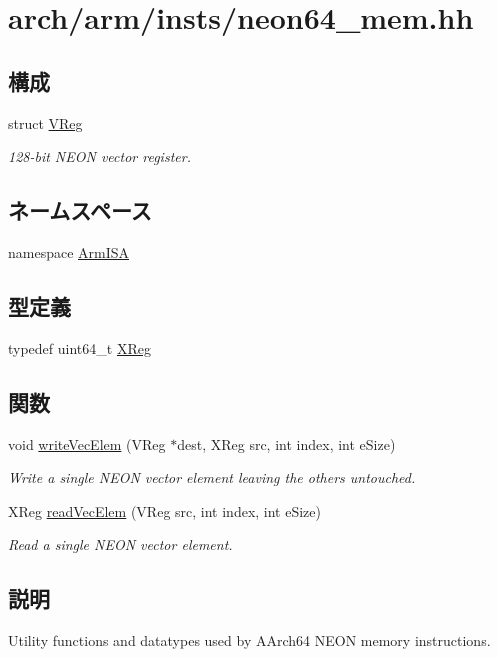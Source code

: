 \hypertarget{neon64__mem_8hh}{
\section{arch/arm/insts/neon64\_\-mem.hh}
\label{neon64__mem_8hh}
}
\subsection*{構成}
\begin{DoxyCompactItemize}
\item 
struct \hyperlink{structArmISA_1_1VReg}{VReg}
\begin{DoxyCompactList}\small\item\em 128-\/bit NEON vector register. \item\end{DoxyCompactList}\end{DoxyCompactItemize}
\subsection*{ネームスペース}
\begin{DoxyCompactItemize}
\item 
namespace \hyperlink{namespaceArmISA}{ArmISA}
\end{DoxyCompactItemize}
\subsection*{型定義}
\begin{DoxyCompactItemize}
\item 
typedef uint64\_\-t \hyperlink{namespaceArmISA_a7fdeef747c8fdcfa4770debfb2dc823d}{XReg}
\end{DoxyCompactItemize}
\subsection*{関数}
\begin{DoxyCompactItemize}
\item 
void \hyperlink{namespaceArmISA_ab2bd1fb8f7f2025cb5ca645c82c04ae8}{writeVecElem} (VReg $\ast$dest, XReg src, int index, int eSize)
\begin{DoxyCompactList}\small\item\em Write a single NEON vector element leaving the others untouched. \item\end{DoxyCompactList}\item 
XReg \hyperlink{namespaceArmISA_aac5e33d403e152b3b7c22d359c8d3bf4}{readVecElem} (VReg src, int index, int eSize)
\begin{DoxyCompactList}\small\item\em Read a single NEON vector element. \item\end{DoxyCompactList}\end{DoxyCompactItemize}


\subsection{説明}
Utility functions and datatypes used by AArch64 NEON memory instructions. 